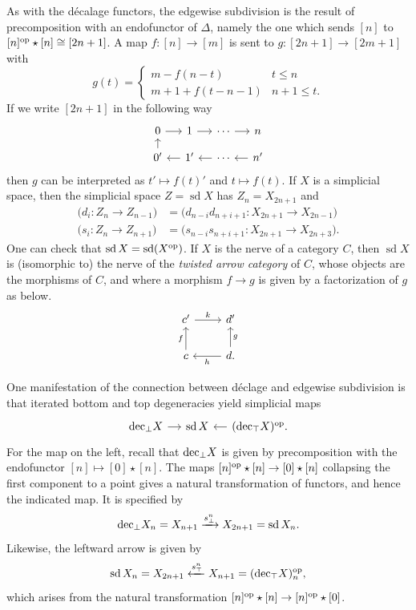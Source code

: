 \documentclass{amsart}
\theoremstyle{definition}
\theoremstyle{remark}
\newcommand{\op}{\textup{op}}
\newcommand{\udec}{\textup{dec}_{\top}}
\newcommand{\ldec}{\textup{dec}_{\perp}}
\DeclareMathOperator{\sd}{sd}
\begin{document}
As with the d\'ecalage functors, the edgewise subdivision is the result of precomposition with an endofunctor of $\Delta$, namely the one which sends $[n]$ to $[n]^\op \star [n] \cong [2n+1]$.
A map $f \colon [n] \to [m]$ is sent to $g \colon [2n+1] \to [2m+1]$ with
\[
g(t) = \begin{cases}
m - f(n-t) & t \leq n \\
m+1 + f(t-n-1) & n+1 \leq t.
\end{cases}
\]
If we write $[2n+1]$ in the following way
\[
\begin{tikzcd}[sep=small]
  0 \rar & 1 \rar & \cdots \rar & n \\
  0' \uar & 1' \lar & \cdots \lar & n' \lar
\end{tikzcd}
\]
then $g$ can be interpreted as $t' \mapsto f(t)'$ and $t \mapsto f(t)$.
If $X$ is a simplicial space, then the simplicial space $Z = \sd X$ has $Z_n = X_{2n+1}$ and
\begin{align*}
  \big(d_i \colon Z_n \to Z_{n-1}\big) &= \big(d_{n-i} d_{n+i+1} \colon X_{2n+1} \to X_{2n-1}\big) \\
  \big(s_i \colon Z_n \to Z_{n+1}\big) &= \big(s_{n-i} s_{n+i+1} \colon X_{2n+1} \to X_{2n+3}\big).
\end{align*}
One can check that $\sd X = \sd (X^\op)$. %
If $X$ is the nerve of a category $C$, then $\sd X$ is (isomorphic to) the nerve of the \emph{twisted arrow category} of $C$, whose objects are the morphisms of $C$, and where a morphism $f \to g$ is given by a factorization of $g$ as below.
\[
\begin{tikzcd}  
  c' \rar{k} & d' \\
  c \uar{f} & d \lar{h} \uar[swap]{g}.
\end{tikzcd}
\]

One manifestation of the connection between d\'eclage and edgewise subdivision is that iterated bottom and top degeneracies yield simplicial maps
\[ \begin{tikzcd}[sep=small]
\ldec X \rar & \sd X & (\udec X)^\op. \lar
\end{tikzcd} \]
For the map on the left, recall that $\ldec X$ is given by precomposition with the endofunctor $[n] \mapsto [0] \star [n]$. 
The maps $[n]^\op \star [n] \to [0] \star [n]$ collapsing the first component to a point gives a natural transformation of functors, and hence the indicated map.
It is specified by
\begin{equation}\label{eq ldec to sd}
  \ldec X_n = X_{n+1} \xrightarrow{s_\bot^n} X_{2n+1} = \sd X_n.
\end{equation}
Likewise, the leftward arrow is given by
\[
  \sd X_n = X_{2n+1} \xleftarrow{s_\top^n} X_{n+1} = (\udec X)^\op_n,
\]
which arises from the natural transformation $[n]^\op \star [n] \to [n]^\op \star [0]$.
\end{document}
